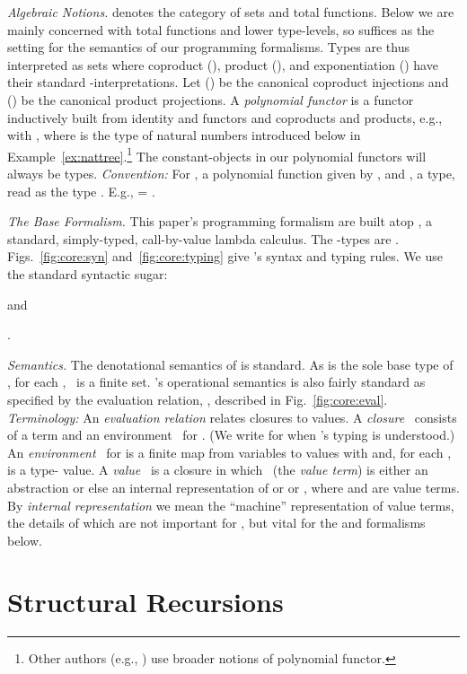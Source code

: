 \documentclass[envcountsame]{llncs}
\begin{document}
\emph{Algebraic Notions.} 
 denotes the category of sets and total functions.  
Below we are mainly concerned with total functions and lower
type-levels, so  suffices as the setting for the semantics of 
our programming formalisms.
Types are thus interpreted as sets where
coproduct (), product (), and exponentiation () have
their standard -interpretations.  Let  () be the canonical coproduct injections and
 () be the canonical
product projections.
A \emph{polynomial functor} is a functor inductively built from 
identity and functors and coproducts and products,
e.g.,
 with 
, where 
 is the type of natural numbers introduced below in 
Example~\ref{ex:nattree}.\footnote{Other authors (e.g., \cite{rutten:coalg}) use broader 
  notions of polynomial functor.} 
The constant-objects in our polynomial functors will always be
types.  \emph{Convention:} For , a polynomial function given by
, and , a type, read  as
the type .
E.g.,  = .


\emph{The Base Formalism.}
This paper's programming formalism are built atop , a standard,
simply-typed, call-by-value lambda calculus.  The -types are
.  Figs.~\ref{fig:core:syn}
and~\ref{fig:core:typing} give 's syntax and typing rules.  We
use the standard syntactic sugar:
\begin{inparaenum}[\it (i)]
\item 
   
  
   and 
\item 
  
  
  .
\end{inparaenum}

\emph{Semantics.} 
The denotational semantics of  is standard.  As  is the
sole base type of , for each
, \  is a finite set.
's operational semantics is also fairly standard as specified by
the evaluation relation, , described in
Fig.~\ref{fig:core:eval}.  \emph{Terminology:} An \emph{evaluation
  relation} relates closures to values.  A
\emph{closure}~ consists of a term
 and an environment~ for
.  (We write  for  when 's typing is understood.)  An
\emph{environment}~ for  is a
finite map from variables to values with
 and, for each
,  is a type- value.
A \emph{value}~ is a closure in which~ (the \emph{value
  term}) is either an abstraction or else an internal representation
of  or  or , where  and
 are value terms.  By \emph{internal representation} we mean
the ``machine'' representation of value terms, the details of which
are not important for , but vital for the  and 
formalisms below.  

\section{Structural Recursions} 	
\end{document}
